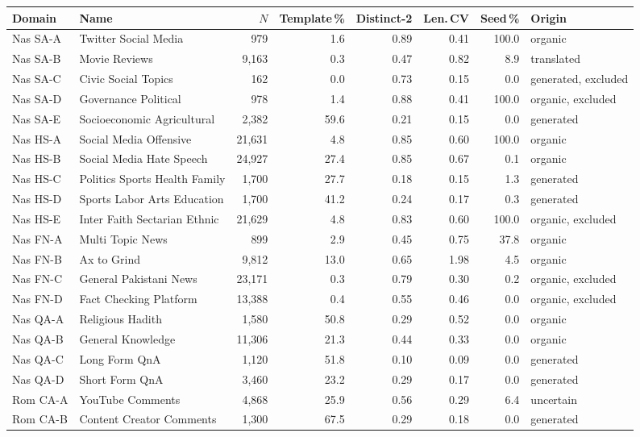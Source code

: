 \begin{tabular}{llrrrrrl}
\toprule
Domain & Name & $N$ & Template\,\% & Distinct-2 & Len.\,CV & Seed\,\% & Origin \\
\midrule
Nas SA-A & Twitter Social Media & 979 & 1.6 & 0.89 & 0.41 & 100.0 & organic \\
Nas SA-B & Movie Reviews & 9,163 & 0.3 & 0.47 & 0.82 & 8.9 & translated \\
Nas SA-C & Civic Social Topics & 162 & 0.0 & 0.73 & 0.15 & 0.0 & generated, excluded \\
Nas SA-D & Governance Political & 978 & 1.4 & 0.88 & 0.41 & 100.0 & organic, excluded \\
Nas SA-E & Socioeconomic Agricultural & 2,382 & 59.6 & 0.21 & 0.15 & 0.0 & generated \\
Nas HS-A & Social Media Offensive & 21,631 & 4.8 & 0.85 & 0.60 & 100.0 & organic \\
Nas HS-B & Social Media Hate Speech & 24,927 & 27.4 & 0.85 & 0.67 & 0.1 & organic \\
Nas HS-C & Politics Sports Health Family & 1,700 & 27.7 & 0.18 & 0.15 & 1.3 & generated \\
Nas HS-D & Sports Labor Arts Education & 1,700 & 41.2 & 0.24 & 0.17 & 0.3 & generated \\
Nas HS-E & Inter Faith Sectarian Ethnic & 21,629 & 4.8 & 0.83 & 0.60 & 100.0 & organic, excluded \\
Nas FN-A & Multi Topic News & 899 & 2.9 & 0.45 & 0.75 & 37.8 & organic \\
Nas FN-B & Ax to Grind & 9,812 & 13.0 & 0.65 & 1.98 & 4.5 & organic \\
Nas FN-C & General Pakistani News & 23,171 & 0.3 & 0.79 & 0.30 & 0.2 & organic, excluded \\
Nas FN-D & Fact Checking Platform & 13,388 & 0.4 & 0.55 & 0.46 & 0.0 & organic, excluded \\
Nas QA-A & Religious Hadith & 1,580 & 50.8 & 0.29 & 0.52 & 0.0 & organic \\
Nas QA-B & General Knowledge & 11,306 & 21.3 & 0.44 & 0.33 & 0.0 & organic \\
Nas QA-C & Long Form QnA & 1,120 & 51.8 & 0.10 & 0.09 & 0.0 & generated \\
Nas QA-D & Short Form QnA & 3,460 & 23.2 & 0.29 & 0.17 & 0.0 & generated \\
Rom CA-A & YouTube Comments & 4,868 & 25.9 & 0.56 & 0.29 & 6.4 & uncertain \\
Rom CA-B & Content Creator Comments & 1,300 & 67.5 & 0.29 & 0.18 & 0.0 & generated \\

\end{tabular}
